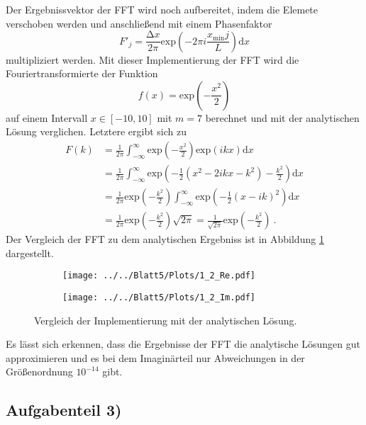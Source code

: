 Der Ergebnissvektor der FFT wird noch aufbereitet, indem die Elemete verschoben werden und anschließend
mit einem Phasenfaktor
\begin{equation}
  F'_j=\frac{\increment x}{2\pi}\text{exp}\left(-2\pi i\frac{x_{\text{min}}j}{L} \right) \text{d}x
\end{equation}
multipliziert werden. Mit dieser Implementierung der FFT wird die Fouriertransformierte
der Funktion
\begin{equation}
  f(x)=\text{exp}\left(-\frac{x^2}{2}\right)
\end{equation}
auf einem Intervall $x\in[-10,10]$ mit $m=7$ berechnet und mit der analytischen Lösung verglichen.
Letztere ergibt sich zu
\begin{align}
  F(k)&=\frac{1}{2\pi}\int_{-\infty}^{\infty}\text{exp}\left(-\frac{x^2}{2}\right)\text{exp}\left(
  ikx\right) \text{d}x \\
  &=\frac{1}{2\pi}\int_{-\infty}^{\infty}\text{exp}\left(-\frac{1}{2}(x^2-2ikx-k^2) -\frac{k^2}{2}\right) \text{d}x \\
  &=\frac{1}{2\pi}\text{exp}\left(-\frac{k^2}{2}\right)\int_{-\infty}^{\infty}\text{exp}\left(-\frac{1}{2}(x-ik)^2\right) \text{d}x \\
  &=\frac{1}{2\pi}\text{exp}\left(-\frac{k^2}{2}\right)\sqrt{2\pi}=\frac{1}{\sqrt{2\pi}}\text{exp}\left(-\frac{k^2}{2}\right) \:.
\end{align}
Der Vergleich der FFT zu dem analytischen Ergebniss ist in Abbildung \ref{fig:plot2} dargestellt.
\begin{figure}[h]
\begin{subfigure}[c]{0.5\textwidth}
\texttt{[image: ../../Blatt5/Plots/1\_2\_Re.pdf]}
\end{subfigure}
\begin{subfigure}[c]{0.5\textwidth}
\texttt{[image: ../../Blatt5/Plots/1\_2\_Im.pdf]}
\end{subfigure}
\caption{Vergleich der Implementierung mit der analytischen Lösung.}
\label{fig:plot2}
\end{figure}
Es lässt sich erkennen, dass die Ergebnisse der FFT die analytische Lösungen gut approximieren und es bei dem Imaginärteil nur Abweichungen in der Größenordnung $10^{-14}$ gibt.


\subsection*{Aufgabenteil 3)}

